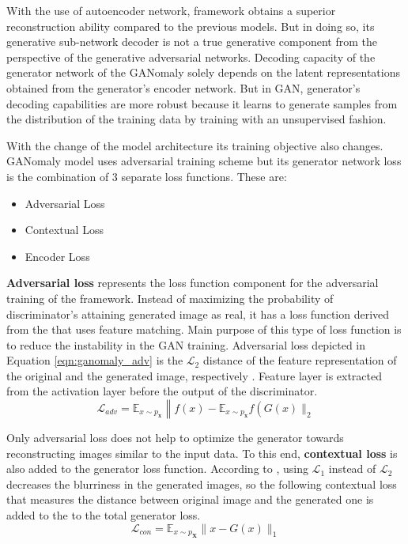 { With the use of autoencoder network, framework obtains a superior reconstruction ability
compared to the previous models. But in doing so, its generative sub-network decoder is not a true
generative component from the perspective of the generative adversarial networks. Decoding capacity of the 
generator network of the GANomaly solely depends on the latent representations obtained from the generator's encoder
network. But in GAN, generator's decoding capabilities are more robust because it learns to generate samples from the 
distribution of the training data by training with an unsupervised fashion.

 With the change of the model architecture its training objective also changes. GANomaly model uses adversarial
training scheme but its generator network loss is the combination of 3 separate loss functions. These
are:
\begin{itemize}
   \item Adversarial Loss
   \item Contextual Loss
   \item Encoder Loss 
\end{itemize} 

\textbf{Adversarial loss} represents the loss function component for the adversarial training of the
framework. Instead of maximizing the probability of discriminator's attaining generated image as
real, it has a loss function derived from the \cite{fm} that uses feature matching. Main purpose
of this type of loss function is to reduce the instability in the GAN training. Adversarial loss
depicted in Equation \ref{eqn:ganomaly_adv} is the $\mathcal{L}_{2}$ distance of the feature
representation of the original and the generated image, respectively \cite{Akay2018GANomalySA}.
Feature layer is extracted from the activation layer before the output of the discriminator.  
\begin{equation}
    \label{eqn:ganomaly_adv}
    \mathcal{L}_{a d v}=\mathbb{E}_{x \sim p_{\mathbf{x}}}\left\|f(x)-\mathbb{E}_{x \sim p_{\mathbf{x}}} f\left(G(x) \|_{2}\right.\right. 
\end{equation}

Only adversarial loss does not help to optimize the generator towards reconstructing images similar
to the input data. To this end, \textbf{contextual loss} is also added to the generator loss function.
According to \cite{Isola2017ImagetoImageTW}, using $\mathcal{L}_1$ instead of $\mathcal{L}_2$
decreases the blurriness in the generated images, so the following contextual loss that measures the
distance between original image and the generated one is added to the to the total generator loss.
\begin{equation}
    \mathcal{L}_{c o n}=\mathbb{E}_{x \sim p_{\mathbf{X}}}\|x-G(x)\|_{1} 
\end{equation}

}
